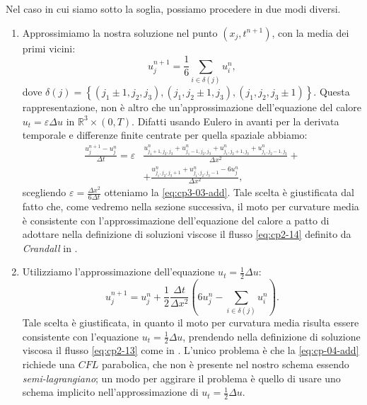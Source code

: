 Nel caso in cui siamo sotto la soglia, possiamo procedere in due modi diversi.
\begin{enumerate}
  \item Approssimiamo la nostra soluzione nel punto $(x_j,t^{n+1})$, con la media dei primi vicini:
    \begin{equation}
      \label{eq:cp3-03-add}
      u_j^{n+1}=\frac{1}{6}\sum_{i\in\delta(j)}u_i^n,
    \end{equation}
dove $\delta(j)=\left\{(j_1\pm 1,j_2,j_3),(j_1,j_2\pm 1,j_3),(j_1,j_2,j_3\pm 1)\right\}$. Questa rappresentazione, non è altro che un'approssimazione dell'equazione del calore $u_t=\varepsilon\Delta u$ in $\mathbb{R}^3\times(0,T)$. Difatti usando Eulero in avanti per la derivata temporale e differenze finite centrate per quella spaziale abbiamo:
\[
\begin{aligned}
  \frac{u_j^{n+1}-u_j^n}{\Delta t}=\varepsilon&\frac{u_{j_1 + 1,j_2,j_3}^n +
    u_{j_1 - 1,j_2,j_3}^n + u_{j_1,j_2 + 1,j_3}^n + u_{j_1,j_2 - 1,j_3}^n}{\Delta x^2} + \\
    &+ \frac{u_{j_1,j_2,j_3 + 1}^n + u_{j_1,j_2,j_3 - 1}^n - 6u_j^n}{\Delta x^2},
\end{aligned}
\]
scegliendo $\varepsilon=\frac{\Delta x^2}{6\Delta t}$ otteniamo la \eqref{eq:cp3-03-add}.
Tale scelta è giustificata dal fatto che, come vedremo nella sezione
successiva, il moto per curvature media è consistente con
l'approssimazione dell'equazione del calore a patto di adottare nella
definizione di soluzioni viscose il flusso \eqref{eq:cp2-14} definito da
\emph{Crandall} in \cite[][]{crand:lion}.

  \item Utilizziamo l'approssimazione dell'equazione $u_t=\frac{1}{2}\Delta u$:
    \begin{equation}
      \label{eq:cp-04-add}
      u_j^{n+1}=u_j^n +\frac{1}{2}\frac{\Delta t}{\Delta x^2}\left(6u_j^n - \sum_{i\in\delta(j)}u_i^n\right).
    \end{equation}
Tale scelta è giustificata, in quanto il moto per curvatura media
risulta essere consistente con l'equazione $u_t=\frac{1}{2}\Delta u$,
prendendo nella definizione di soluzione viscosa il flusso 
\eqref{eq:cp2-13} come in \cite[][]{fed:drag}. L'unico problema è
che la \eqref{eq:cp-04-add} richiede una $\mathit{CFL}$ parabolica, che non è presente nel nostro schema essendo \emph{semi-lagrangiano}; un modo per aggirare il problema è quello di usare uno schema implicito nell'approssimazione di  $u_t=\frac{1}{2}\Delta u$.
\end{enumerate}
